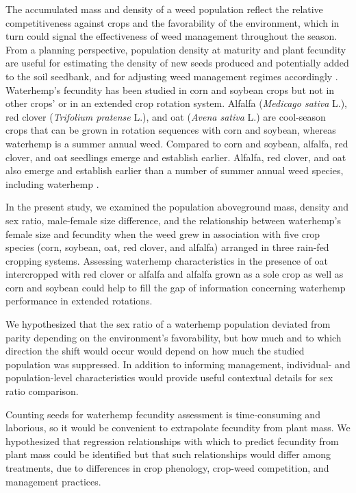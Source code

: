 \documentclass[
]{article}
\begin{document}
The accumulated mass and density of a weed population reflect the relative competitiveness against crops and the favorability of the environment, which in turn could signal the effectiveness of weed management throughout the season. From a planning perspective, population density at maturity and plant fecundity are useful for estimating the density of new seeds produced and potentially added to the soil seedbank, and for adjusting weed management regimes accordingly \citep{buhlerImplicationsWeedSeedbank1997}. Waterhemp's fecundity has been studied in corn and soybean crops \citep{menalledImpactCompostedSwine2004, nordbyInfluenceCornCommon2004} but not in other crops' or in an extended crop rotation system.
Alfalfa (\emph{Medicago sativa} L.), red clover (\emph{Trifolium pratense} L.), and oat (\emph{Avena sativa} L.) are cool-season crops that can be grown in rotation sequences with corn and soybean, whereas waterhemp is a summer annual weed. Compared to corn and soybean, alfalfa, red clover, and oat seedlings emerge and establish earlier. Alfalfa, red clover, and oat also emerge and establish earlier than a number of summer annual weed species, including waterhemp \citep{buhlerRelativeEmergenceSequence2008, horakGrowthAnalysisFour2000}.

In the present study, we examined the population aboveground mass, density and sex ratio, male-female size difference, and the relationship between waterhemp's female size and fecundity when the weed grew in association with five crop species (corn, soybean, oat, red clover, and alfalfa) arranged in three rain-fed cropping systems. Assessing waterhemp characteristics in the presence of oat intercropped with red clover or alfalfa and alfalfa grown as a sole crop as well as corn and soybean could help to fill the gap of information concerning waterhemp performance in extended rotations.

We hypothesized that the sex ratio of a waterhemp population deviated from parity depending on the environment's favorability, but how much and to which direction the shift would occur would depend on how much the studied population was suppressed. In addition to informing management, individual- and population-level characteristics would provide useful contextual details for sex ratio comparison.

Counting seeds for waterhemp fecundity assessment is time-consuming and laborious, so it would be convenient to extrapolate fecundity from plant mass. We hypothesized that regression relationships with which to predict fecundity from plant mass could be identified but that such relationships would differ among treatments, due to differences in crop phenology, crop-weed competition, and management practices.
\end{document}
